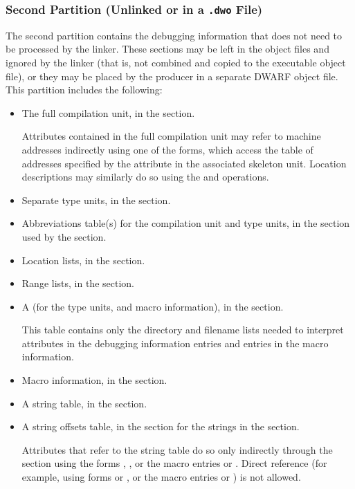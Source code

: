 \subsubsection{Second Partition (Unlinked or in a \texttt{.dwo} File)}
\label{datarep:secondpartition}
The second partition contains the debugging information that
does not need to be processed by the linker. These sections
may be left in the object files and ignored by the linker
(that is, not combined and copied to the executable object file), or
they may be placed by the producer in a separate DWARF object
file. This partition includes the following:
\begin{itemize}
\item
The full compilation unit, in the \dotdebuginfodwo{} section.

Attributes contained in the full compilation unit
may refer to machine addresses indirectly using 
one of the \DWFORMaddrxXNor{} 
forms, which access the table of addresses specified by the
\DWATaddrbase{} attribute in the associated skeleton unit.
Location descriptions may similarly do so using the \DWOPaddrx{} and
\DWOPconstx{} operations. 

\item Separate type units, in the \dotdebuginfodwo{} section.

\item
Abbreviations table(s) for the compilation unit and type
units, in the \dotdebugabbrevdwo{} section
used by the \dotdebuginfodwo{} section.

\item Location lists, in the 
\dotdebugloclistsdwo{} section.

\item Range lists, in the \dotdebugrnglistsdwo{} section.

\item
A  (for the type 
\bb
units, and macro information), 
\eb
in the \dotdebuglinedwo{} section. 

This table
contains only the directory and filename lists needed to
interpret \DWATdeclfile{} attributes in the debugging
information entries
\bb
and \DWMACROstartfile{} entries in the macro information.
\eb

\item Macro information, in the \dotdebugmacrodwo{} section.

\item A string table, in the \dotdebugstrdwo{} section.

\item A string offsets table, in the \dotdebugstroffsetsdwo{}
section
for the strings in the \dotdebugstrdwo{} section.

\bb
Attributes that refer to the \dotdebugstrdwo{} string table do so
only indirectly through the \dotdebugstroffsetsdwo{} section using the
forms \DWFORMstrx, \DWFORMstrxNor, or the macro entries
\DWMACROdefinestrx{} or \DWMACROundefstrx.
Direct reference (for example, using forms \DWFORMstrp{} or \DWFORMstrpeight, or
the macro entries \DWMACROdefinestrp{} or \DWMACROundefstrp)
is not allowed.
\eb
\end{itemize}

